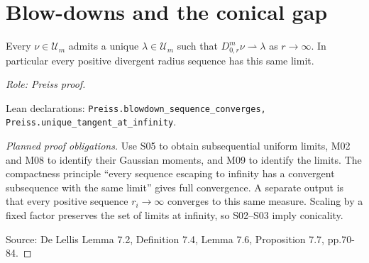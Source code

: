 \section{Blow-downs and the conical gap}

\begin{theorem}
\label{thm:unique-infinity}




Every $\nu\in\mathcal U_m$ admits a unique $\lambda\in\mathcal U_m$ such that $D^m_{0,r}\nu\rightharpoonup\lambda$ as $r\to\infty$. In particular every positive divergent radius sequence has this same limit.
\par\emph{Role: Preiss proof.}
\par Lean declarations: \texttt{Preiss.blowdown\_sequence\_converges, Preiss.unique\_tangent\_at\_infinity}.
\end{theorem}
\begin{proof}[Planned proof obligations]

Use S05 to obtain subsequential uniform limits, M02 and M08 to identify their
Gaussian moments, and M09 to identify the limits. The compactness principle
``every sequence escaping to infinity has a convergent subsequence with the
same limit'' gives full convergence. A separate output is that every positive
sequence $r_i\to\infty$ converges to this same measure. Scaling by a fixed
factor preserves the set of limits at infinity, so S02--S03 imply conicality.
\par Source: De Lellis Lemma 7.2, Definition 7.4, Lemma 7.6, Proposition 7.7, pp.70-84.
\end{proof}


